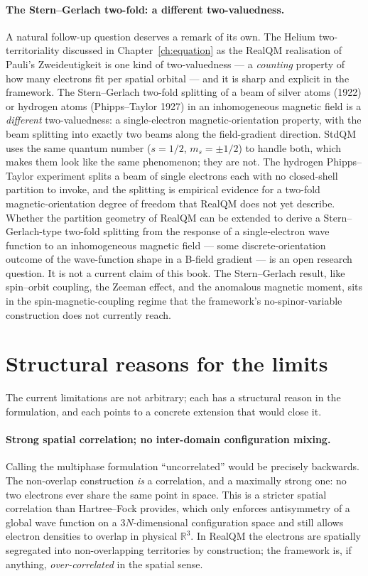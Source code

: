 \paragraph{The Stern--Gerlach two-fold: a different two-valuedness.}
A natural follow-up question deserves a remark of its own. The Helium two-territoriality discussed in Chapter~\ref{ch:equation} as the RealQM realisation of Pauli's Zweideutigkeit is one kind of two-valuedness --- a \emph{counting} property of how many electrons fit per spatial orbital --- and it is sharp and explicit in the framework. The Stern--Gerlach two-fold splitting of a beam of silver atoms (1922) or hydrogen atoms (Phipps--Taylor 1927) in an inhomogeneous magnetic field is a \emph{different} two-valuedness: a single-electron magnetic-orientation property, with the beam splitting into exactly two beams along the field-gradient direction. StdQM uses the same quantum number ($s = 1/2$, $m_s = \pm 1/2$) to handle both, which makes them look like the same phenomenon; they are not. The hydrogen Phipps--Taylor experiment splits a beam of single electrons each with no closed-shell partition to invoke, and the splitting is empirical evidence for a two-fold magnetic-orientation degree of freedom that RealQM does not yet describe. Whether the partition geometry of RealQM can be extended to derive a Stern--Gerlach-type two-fold splitting from the response of a single-electron wave function to an inhomogeneous magnetic field --- some discrete-orientation outcome of the wave-function shape in a B-field gradient --- is an open research question. It is not a current claim of this book. The Stern--Gerlach result, like spin--orbit coupling, the Zeeman effect, and the anomalous magnetic moment, sits in the spin-magnetic-coupling regime that the framework's no-spinor-variable construction does not currently reach.

\section{Structural reasons for the limits}\label{sec:why-limits}

The current limitations are not arbitrary; each has a structural reason in the formulation, and each points to a concrete extension that would close it.

\paragraph{Strong spatial correlation; no inter-domain configuration mixing.}
Calling the multiphase formulation ``uncorrelated'' would be precisely backwards. The non-overlap construction \emph{is} a correlation, and a maximally strong one: no two electrons ever share the same point in space. This is a stricter spatial correlation than Hartree--Fock provides, which only enforces antisymmetry of a global wave function on a $3N$-dimensional configuration space and still allows electron densities to overlap in physical $\mathbb{R}^3$. In RealQM the electrons are spatially segregated into non-overlapping territories by construction; the framework is, if anything, \emph{over-correlated} in the spatial sense.

